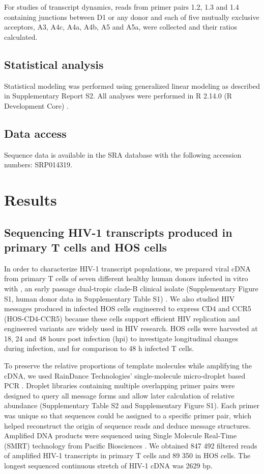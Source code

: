 \documentclass[../sherrill-Mix_thesis.tex]{subfiles}
\begin{document}
For studies of transcript dynamics, reads from primer pairs 1.2, 1.3 and 1.4 containing junctions between D1 or any donor and each of five mutually exclusive acceptors, A3, A4c, A4a, A4b, A5 and A5a, were collected and their ratios calculated. 

\subsection{Statistical analysis}
Statistical modeling was performed using generalized linear modeling as described in Supplementary Report S2. All analyses were performed in R 2.14.0 (R Development Core) \citep{RFIXTHIS}. 

\subsection{Data access}
Sequence data is available in the SRA database with the following accession numbers: SRP014319.

\section{Results}
\subsection{Sequencing HIV-1 transcripts produced in primary T cells and HOS cells}
In order to characterize HIV-1 transcript populations, we prepared viral cDNA from primary \cdFour{} T cells of seven different healthy human donors infected in vitro with \hivEight{}, an early passage dual-tropic clade-B clinical isolate (Supplementary Figure S1, human donor data in Supplementary Table S1) \citep{Collman1992}. We also studied HIV messages produced in infected HOS cells engineered to express CD4 and CCR5 (HOS-CD4-CCR5) because these cells support efficient HIV replication and engineered variants are widely used in HIV research. HOS cells were harvested at 18, 24 and 48 hours post infection (hpi) to investigate longitudinal changes during infection, and for comparison to 48 h infected T cells.

To preserve the relative proportions of template molecules while amplifying the cDNA, we used RainDance Technologies' single-molecule micro-droplet based PCR \citep{Tewhey2009}. Droplet libraries containing multiple overlapping primer pairs were designed to query all message forms and allow later calculation of relative abundance (Supplementary Table S2 and Supplementary Figure S1). Each primer was unique so that sequences could be assigned to a specific primer pair, which helped reconstruct the origin of sequence reads and deduce message structures. Amplified DNA products were sequenced using Single Molecule Real-Time (SMRT) technology from Pacific Biosciences \citep{Eid2009,Travers2010}. We obtained 847 492 filtered reads of amplified HIV-1 transcripts in primary \cdFour{} T cells and 89 350 in HOS cells. The longest sequenced continuous stretch of HIV-1 cDNA was 2629 bp. 
\end{document}
